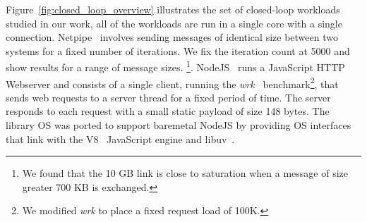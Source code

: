 Figure~\ref{fig:closed_loop_overview} illustrates the set of closed-loop workloads studied in our work, all of the workloads are run in a single core with a single connection. Netpipe~\cite{snell1996netpipe} involves sending messages of identical size between two systems for a fixed number of iterations. We fix the iteration count at 5000 and show results for a range of message sizes. \footnote{We found that the 10 GB link is close to saturation when a message of size greater 700 KB is exchanged.}. NodeJS~\cite{nodejs} runs a JavaScript HTTP Webserver and consists of a single client, running the \textit{wrk}~\cite{wrk} benchmark\footnote{We modified \textit{wrk} to place a fixed request load of 100K.}, that sends web requests to a server thread for a fixed period of time. The server responds to each request with a small static payload of size 148 bytes. The library OS was ported to support baremetal NodeJS by providing OS interfaces that link with the V8~\cite{v8} JavaScript engine and libuv~\cite{libuv}. 












